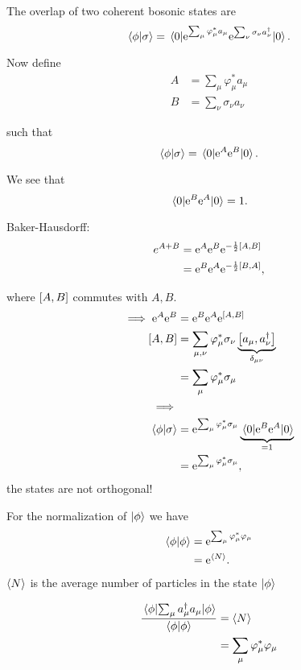 The overlap of two coherent bosonic states are
\begin{equation}
\braket{\phi}{\sigma} = \mel{0}{\mathrm{e}^{\sum_\mu\varphi_\mu^*a_\mu}\mathrm{e}^{\sum_\nu\sigma_\nu a_\nu^\dagger}}{0}.
\end{equation}

Now define 
\begin{align*}
A &= \sum_\mu\varphi_\mu^*a_\mu \\
B &= \sum_\nu\sigma_\nu a_\nu
\end{align*}

such that 
\begin{equation}
\braket{\phi}{\sigma} = \mel{0}{\mathrm{e}^{A}\mathrm{e}^{B}}{0}.
\end{equation}

We see that 
\begin{equation}
\mel{0}{\mathrm{e}^{B}\mathrm{e}^{A}}{0} = 1.
\end{equation}

Baker-Hausdorff:
\begin{align}
e^{A+B} &=\e^{A}\e^{B}\e^{-\frac{1}{2}\comm{A}{B}} \\
		&= \e^{B}\e^{A}\e^{-\frac{1}{2}\comm{B}{A}},
\end{align}

where $\comm{A}{B}$ commutes with $A, B$.
\begin{align}
\implies \e^A\e^B &= \e^B\e^A\e^{\comm{A}{B}} \\
\comm{A}{B} &= \sum_{\mu,\nu}\varphi_\mu^*\sigma_\nu\underbrace{\comm{a_\mu}{a_\nu^\dagger}}_{\delta_{\mu\nu}} \\
	&= \sum_\mu\varphi_\mu^*\sigma_\mu \\
	\implies& \\
	 \braket{\phi}{\sigma} &= \e^{\sum_\mu\varphi_\mu^*\sigma_\mu}\underbrace{\mel{0}{\e^B\e^A}{0}}_{=1}\\
	 &= \e^{\sum_\mu\varphi_\mu^*\sigma_\mu},
\end{align}
the states are not orthogonal!

For the normalization of \(\ket{\phi}\) we have
\begin{align}
\braket{\phi} &= \e^{\sum_\mu\varphi_\mu^*\varphi_\mu} \\
	&= \e^{\ev{N}}.
\end{align}
\(\ev{N}\) is the average number of particles in the state \(\ket{\phi}\)

\begin{align}\label{unc:expvalN}
\frac{\ev{\sum_\mu a_\mu^\dagger a_\mu}{\phi}}{\braket{\phi}} &= \ev{N} \\
&= \sum_\mu \varphi_\mu^*\varphi_\mu
\end{align}

